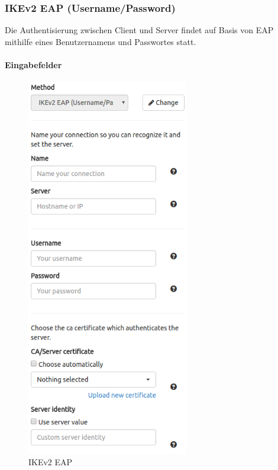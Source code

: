 \subsubsection{IKEv2 EAP (Username/Password)}
Die Authentisierung zwischen Client und Server findet auf Basis von EAP mithilfe eines Benutzernamens und Passwortes statt.

\noindent\begin{minipage}[t]{0.5\textwidth}
\vspace{0pt}
\paragraph{Eingabefelder}\mbox{}\medskip
    \begin{figure}[H]
    	\centering
    	\includegraphics[width=200pt]{images/forms/ikev2_eap.png}
    	\caption{IKEv2 EAP}
    \end{figure}
\end{minipage}
\hfill

